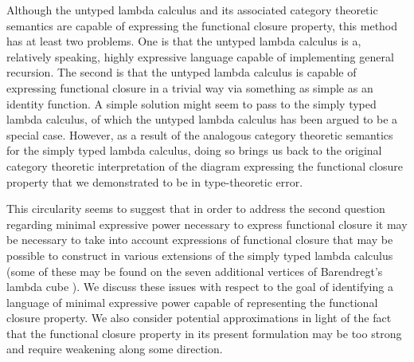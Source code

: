 Although the untyped lambda calculus and its associated category theoretic semantics are capable of expressing the functional closure property, this method has at least two problems. One is that the untyped lambda calculus is a, relatively speaking, highly expressive language capable of implementing general recursion. The second is that the untyped lambda calculus is capable of expressing functional closure in a trivial way via something as simple as an identity function. A simple solution might seem to pass to the simply typed lambda calculus, of which the untyped lambda calculus has been argued to be a special case. However, as a result of the analogous category theoretic semantics for the simply typed lambda calculus, doing so brings us back to the original category theoretic interpretation of the diagram expressing the functional closure property that we demonstrated to be in type-theoretic error.

This circularity seems to suggest that in order to address the second question regarding minimal expressive power necessary to express functional closure it may be necessary to take into account expressions of functional closure that may be possible to construct in various extensions of the simply typed lambda calculus (some of these may be found on the seven additional vertices of Barendregt's lambda cube \cite{Barendregt1985}). We discuss these issues with respect to the goal of identifying a language of minimal expressive power capable of representing the functional closure property. We also consider potential approximations in light of the fact that the functional closure property in its present formulation may be too strong and require weakening along some direction.
